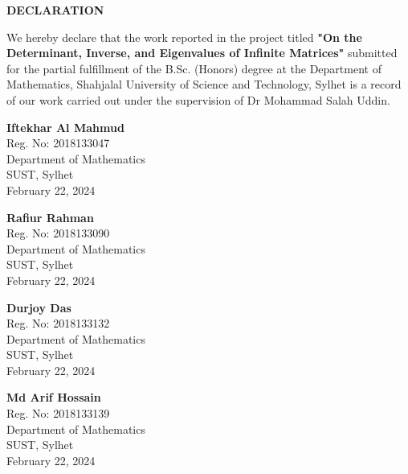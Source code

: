 \newpage

\begin{center}
    \LARGE \textbf{DECLARATION}
\end{center}
\vspace{1cm}
We hereby declare that the work reported in the project titled \textbf{"On the Determinant, Inverse, and Eigenvalues of Infinite Matrices"} submitted for the partial fulfillment of the B.Sc. (Honors) degree at the Department of Mathematics, Shahjalal University of Science and Technology, Sylhet is a record of our work carried out under the supervision of Dr Mohammad Salah Uddin.

\vspace{5cm}
\begin{minipage}{.45\linewidth}
    \begin{flushleft}
        \textbf{Iftekhar Al Mahmud} \\
        Reg. No: 2018133047 \\
        Department of Mathematics \\
        SUST, Sylhet \\
       February 22, 2024
    \end{flushleft}
\end{minipage}
\hfill
\begin{minipage}{.45\linewidth}
    \begin{flushright}
        \textbf{Rafiur Rahman} \\
        Reg. No: 2018133090 \\
        Department of Mathematics \\
        SUST, Sylhet \\
        February 22, 2024
    \end{flushright} 
\end{minipage}

\vspace{5cm}
\begin{minipage}{.45\linewidth}
    \begin{flushleft}
        \textbf{Durjoy Das} \\
        Reg. No: 2018133132 \\
        Department of Mathematics \\
        SUST, Sylhet \\
       February 22, 2024
    \end{flushleft}
\end{minipage}
\hfill
\begin{minipage}{.45\linewidth}
    \begin{flushright}
        \textbf{Md Arif Hossain} \\
        Reg. No: 2018133139 \\
        Department of Mathematics \\
        SUST, Sylhet \\
        February 22, 2024
    \end{flushright} 
\end{minipage}
\newpage

